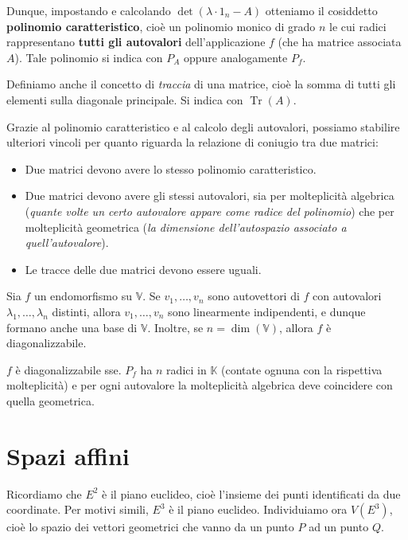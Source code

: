 \documentclass[12pt]{report}
\newcommand{\K}{\mathbb{K}}
\newcommand{\V}{\mathbb{V}}
\newcommand{\vectors}[1]{#1_1, \dots, #1_n}
\begin{document}
	Dunque, impostando e calcolando $\det(\lambda \cdot 1_n - A)$ otteniamo il cosiddetto \textbf{polinomio caratteristico}, cioè un polinomio monico di grado $n$ le cui radici rappresentano \textbf{tutti gli autovalori} dell'applicazione $f$ (che ha matrice associata $A$).
	Tale polinomio si indica con $P_A$ oppure analogamente $P_f$.
	
	Definiamo anche il concetto di \textit{traccia} di una matrice, cioè la somma di tutti gli elementi sulla diagonale principale. Si indica con $\operatorname{Tr}(A)$.
	
	Grazie al polinomio caratteristico e al calcolo degli autovalori, possiamo stabilire ulteriori vincoli per quanto riguarda la relazione di coniugio tra due matrici:
	\begin{itemize}
		\item Due matrici devono avere lo stesso polinomio caratteristico.
		\item Due matrici devono avere gli stessi autovalori, sia per molteplicità algebrica (\textit{quante volte un certo autovalore appare come radice del polinomio}) che per molteplicità geometrica (\textit{la dimensione dell'autospazio associato a quell'autovalore}).
		\item Le tracce delle due matrici devono essere uguali.
	\end{itemize}
	
	\begin{proposizione}{}{}
		Sia $f$ un endomorfismo su $\V$. Se $\vectors{v}$ sono autovettori di $f$ con autovalori $\vectors{\lambda}$ distinti, allora $\vectors{v}$ sono linearmente indipendenti, e dunque formano anche una base di $\V$.
		Inoltre, se $n = \dim(\V)$, allora $f$ è diagonalizzabile.
	\end{proposizione}
	
	\begin{proposizione}{}{}
		$f$ è diagonalizzabile sse. $P_f$ ha $n$ radici in $\K$ (contate ognuna con la rispettiva molteplicità) e per ogni autovalore la molteplicità algebrica deve coincidere con quella geometrica.
	\end{proposizione}
	
	\newpage
	\chapter{Spazi affini}
	Ricordiamo che $E^2$ è il piano euclideo, cioè l'insieme dei punti identificati da due coordinate. Per motivi simili, $E^3$ è il piano euclideo.
	Individuiamo ora $V(E^3)$, cioè lo spazio dei vettori geometrici che vanno da un punto $P$ ad un punto $Q$.
	
\end{document}
